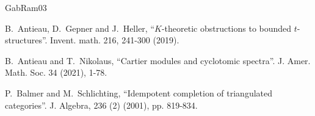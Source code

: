 \documentclass[11pt,leqno]{amsart}
\numberwithin{equation}{section}
\begin{document}
\begin{thebibliography}{GabRam03}






 B.~Antieau, D.~Gepner and J.~Heller, ``$K$-theoretic obstructions to bounded $t$-structures''. Invent. math. 216, 241-300 (2019).

 B.~Antieau and T.~Nikolaus, ``Cartier modules and cyclotomic spectra''. J. Amer. Math. Soc. 34 (2021), 1-78.






 P.~Balmer and M.~Schlichting, ``Idempotent completion of triangulated categories''. J. Algebra, 236 (2) (2001), pp. 819-834.



\end{thebibliography}
\end{document}
